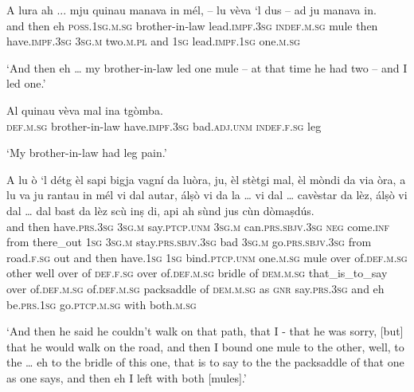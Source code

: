 \begin{linenumbers}
\gll   A lura ah ... mju quinau manava in mél, – lu vèva `l dus – ad ju manava in. \\
and then eh {} \textsc{poss.1sg.m.sg} brother-in-law lead.\textsc{impf.3sg} \textsc{indef.m.sg} mule {} then have.\textsc{impf.3sg} \textsc{3sg.m} two.\textsc{m.pl} {} and \textsc{1sg} lead.\textsc{impf.1sg} one.\textsc{m.sg} \\
\end{linenumbers}
\medskip
\glt `And then eh … my brother-in-law led one mule – at that time he had two – and I led one.'
\medskip

\begin{linenumbers}
\gll   Al quinau vèva mal ina tgòmba. \\
 \textsc{def.m.sg} brother-in-law have.\textsc{impf.3sg} bad.\textsc{adj.unm} \textsc{indef.f.sg} leg \\
\end{linenumbers}
\medskip
\glt `My brother-in-law had leg pain.'
\medskip

\begin{linenumbers}
\gll  A lu ò `l détg èl sapi bigja vagní da luòra, ju, èl stètgi mal, èl mòndi da via òra, a lu va ju rantau in mél vi dal autar,  álṣò vi da la … vi dal … cavèstar da lèz, álṣò vi dal … dal bast da lèz scù inṣ di, api ah sùnd jus cùn dòmaṣdús.  \\
and then have.\textsc{prs.3sg} \textsc{3sg.m} say.\textsc{ptcp.unm} \textsc{3sg.m} can.\textsc{prs.sbjv.3sg} \textsc{neg} come.\textsc{inf} from there\_out \textsc{1sg}  \textsc{3sg.m} stay.\textsc{prs.sbjv.3sg} bad \textsc{3sg.m} go.\textsc{prs.sbjv.3sg} from road.\textsc{f.sg} out and then have.\textsc{1sg} \textsc{1sg} bind.\textsc{ptcp.unm} one.\textsc{m.sg} mule over of.\textsc{def.m.sg} other well over of \textsc{def.f.sg} {} over of.\textsc{def.m.sg} {} bridle of \textsc{dem.m.sg} that\_is\_to\_say over of.\textsc{def.m.sg} {} of.\textsc{def.m.sg} packsaddle of \textsc{dem.m.sg} as \textsc{gnr}  say.\textsc{prs.3sg} and eh be.\textsc{prs.1sg} go.\textsc{ptcp.m.sg} with both.\textsc{m.sg} \\
\end{linenumbers}
\medskip
\glt `And then he said he couldn’t walk on that path, that I - that he was sorry, [but] that he would walk on the road, and then I bound one mule to the other, well, to the … eh to the bridle of this one, that is to say to the the packsaddle of that one as one says, and then eh I left with both [mules].'
\medskip

